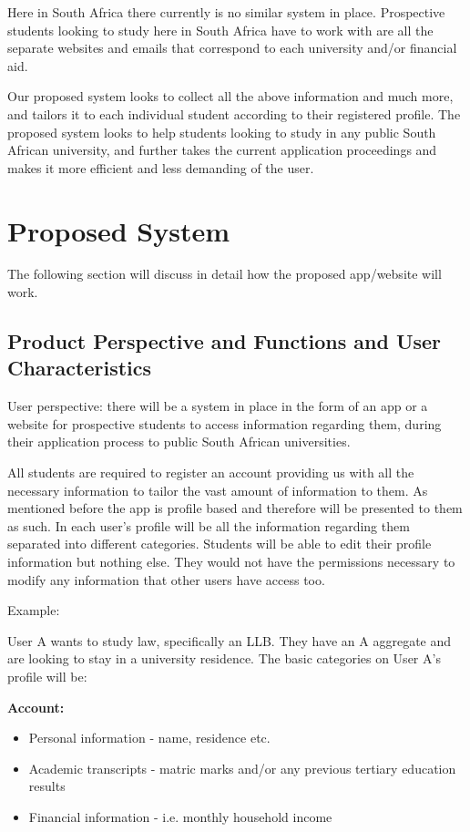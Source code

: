 \documentclass[a4paper, 12pt]{article}
\begin{document}
Here in South Africa there currently is no similar system in place. Prospective students looking to study here in South Africa have to work with are all the separate websites and emails that correspond to each university and/or financial aid.

Our proposed system looks to collect all the above information and much more, and tailors it to each individual student according to their registered profile. The proposed system looks to help students looking to study in any public South African university, and further takes the current application proceedings and makes it more efficient and less demanding of the user.


\newpage
\section{Proposed System}

The following section will discuss in detail how the proposed app/website will work.

\subsection{Product Perspective and Functions and User Characteristics}

User perspective: there will be a system in place in the form of an app or a website for prospective students to access information regarding them, during their application process to public South African universities. 

All students are required to register an account providing us with all the necessary information to tailor the vast amount of information to them. As mentioned before the app is profile based and therefore will be presented to them as such. In each user’s profile will be all the information regarding them separated into different categories. Students will be able to edit their profile information but nothing else. They would not have the permissions necessary to modify any information that other users have access too.

Example:

User A wants to study law, specifically an LLB. They have an A aggregate and are looking to stay in a university residence.
The basic categories on User A’s profile will be:

\textbf{Account:}
\begin{itemize}
\item Personal information - name, residence etc.
\item Academic transcripts - matric marks and/or any previous tertiary education results
\item Financial information - i.e. monthly household income 
\end{itemize}
\end{document}

